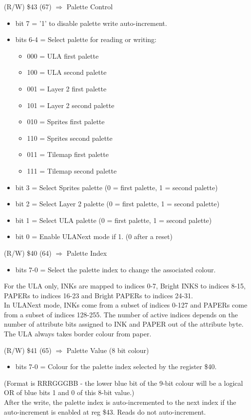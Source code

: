 (R/W) \$43 (67) $\Rightarrow$ Palette Control
\begin{itemize}
\item[] bit 7 = '1' to disable palette write auto-increment.
\item[] bits 6-4 = Select palette for reading or writing:
  \begin{itemize}
  \item[] 000 = ULA first palette
  \item[] 100 = ULA second palette
  \item[] 001 = Layer 2 first palette
  \item[] 101 = Layer 2 second palette
  \item[] 010 = Sprites first palette
  \item[] 110 = Sprites second palette
  \item[] 011 = Tilemap first palette
  \item[] 111 = Tilemap second palette
  \end{itemize}
\item[] bit 3 = Select Sprites palette (0 = first palette, 1 = second palette)
\item[] bit 2 = Select Layer 2 palette (0 = first palette, 1 = second palette)
\item[] bit 1 = Select ULA palette (0 = first palette, 1 = second palette)
\item[] bit 0 = Enable ULANext mode if 1. (0 after a reset)
\end{itemize}

(R/W) \$40 (64) $\Rightarrow$ Palette Index
\begin{itemize}
\item[] bits 7-0 = Select the palette index to change the associated colour.
\end{itemize}
For the ULA only, INKs are mapped to indices 0-7, Bright INKS to
indices 8-15, PAPERs to indices 16-23 and Bright PAPERs to indices
24-31.\\
In ULANext mode, INKs come from a subset of indices 0-127 and PAPERs
come from a subset of indices 128-255. The number of active indices
depends on the number of attribute bits assigned to INK and PAPER out
of the attribute byte.  The ULA always takes border colour from paper.

(R/W) \$41 (65) $\Rightarrow$ Palette Value (8 bit colour)
\begin{itemize}
\item[] bits 7-0 = Colour for the palette index selected by the register \$40.
\end{itemize}
(Format is RRRGGGBB - the lower blue bit of the 9-bit colour will be a
logical OR of blue bits 1 and 0 of this 8-bit value.)\\
After the write, the palette index is auto-incremented to the next
index if the auto-increment is enabled at reg \$43. Reads do not
auto-increment.

